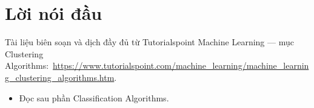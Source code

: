 \documentclass[12pt,a4paper]{article}
\newcommand{\tsurl}[1]{\url{#1}}
\begin{document}

\newpage
\tableofcontents
\newpage

\section*{Lời nói đầu}

\begin{ynghia}[title={Nguồn}]
Tài liệu biên soạn và dịch đầy đủ từ Tutorialspoint Machine Learning --- mục Clustering Algorithms:\ \tsurl{https://www.tutorialspoint.com/machine_learning/machine_learning_clustering_algorithms.htm}.
\end{ynghia}

\begin{phuongphap}[title={Cách dùng}]
\begin{itemize}
  \item Đọc sau phần Classification Algorithms.
\end{itemize}
\end{phuongphap}

\newpage















\end{document}
